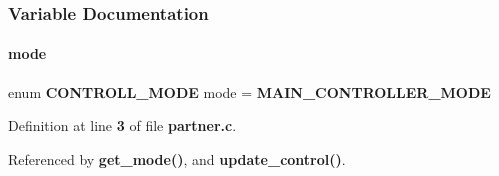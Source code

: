 \subsubsection{Variable Documentation}
\mbox{\label{partner_8c_ac57f7e8cb1c4e638c8c477740314a109}} 
\paragraph{mode}
{\footnotesize\ttfamily enum \textbf{ C\+O\+N\+T\+R\+O\+L\+L\+\_\+\+M\+O\+DE} mode = \textbf{ M\+A\+I\+N\+\_\+\+C\+O\+N\+T\+R\+O\+L\+L\+E\+R\+\_\+\+M\+O\+DE}\hspace{0.3cm}{\ttfamily [static]}}



Definition at line \textbf{ 3} of file \textbf{ partner.\+c}.



Referenced by \textbf{ get\+\_\+mode()}, and \textbf{ update\+\_\+control()}.


